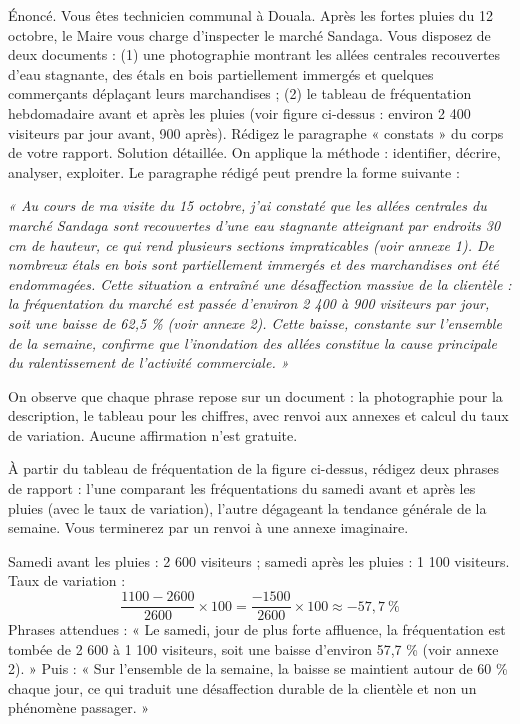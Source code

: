 \documentclass[11pt]{article}
\newcounter{popsec}
\newcounter{popsub}
\newcommand{\courssub}[1]{%
  \stepcounter{popsub}%
  \par\vspace{9pt}\noindent{\popxbold\fontsize{11.5}{13}\selectfont\color{popink}{\color{poporange}\thepopsec.\thepopsub}\hspace{6pt}#1}\par\nopagebreak\vspace{4pt}
}
\begin{document}
\courssub{Activité guidée : rédiger le paragraphe « constats »}

\begin{exoresolu}
Énoncé. Vous êtes technicien communal à Douala. Après les fortes pluies du 12 octobre, le Maire vous charge d'inspecter le marché Sandaga. Vous disposez de deux documents : (1) une photographie montrant les allées centrales recouvertes d'eau stagnante, des étals en bois partiellement immergés et quelques commerçants déplaçant leurs marchandises ; (2) le tableau de fréquentation hebdomadaire avant et après les pluies (voir figure ci-dessus : environ 2 400 visiteurs par jour avant, 900 après). Rédigez le paragraphe « constats » du corps de votre rapport.
\tcblower
Solution détaillée. On applique la méthode : identifier, décrire, analyser, exploiter. Le paragraphe rédigé peut prendre la forme suivante :

\emph{« Au cours de ma visite du 15 octobre, j'ai constaté que les allées centrales du marché Sandaga sont recouvertes d'une eau stagnante atteignant par endroits 30 cm de hauteur, ce qui rend plusieurs sections impraticables (voir annexe 1). De nombreux étals en bois sont partiellement immergés et des marchandises ont été endommagées. Cette situation a entraîné une désaffection massive de la clientèle : la fréquentation du marché est passée d'environ 2 400 à 900 visiteurs par jour, soit une baisse de 62,5 \% (voir annexe 2). Cette baisse, constante sur l'ensemble de la semaine, confirme que l'inondation des allées constitue la cause principale du ralentissement de l'activité commerciale. »}

On observe que chaque phrase repose sur un document : la photographie pour la description, le tableau pour les chiffres, avec renvoi aux annexes et calcul du taux de variation. Aucune affirmation n'est gratuite.
\end{exoresolu}

\begin{exercice}
À partir du tableau de fréquentation de la figure ci-dessus, rédigez deux phrases de rapport : l'une comparant les fréquentations du samedi avant et après les pluies (avec le taux de variation), l'autre dégageant la tendance générale de la semaine. Vous terminerez par un renvoi à une annexe imaginaire.
\end{exercice}

\begin{corrige}[Exercice]
Samedi avant les pluies : 2 600 visiteurs ; samedi après les pluies : 1 100 visiteurs. Taux de variation :
\[ \frac{1100 - 2600}{2600} \times 100 = \frac{-1500}{2600} \times 100 \approx -57{,}7\ \% \]
Phrases attendues : « Le samedi, jour de plus forte affluence, la fréquentation est tombée de 2 600 à 1 100 visiteurs, soit une baisse d'environ 57,7 \% (voir annexe 2). » Puis : « Sur l'ensemble de la semaine, la baisse se maintient autour de 60 \% chaque jour, ce qui traduit une désaffection durable de la clientèle et non un phénomène passager. »
\end{corrige}
\end{document}
